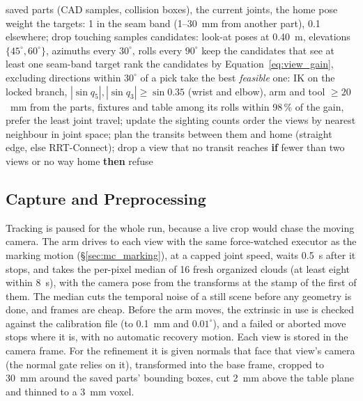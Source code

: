 \begin{algorithm}[htbp]
\caption{Planning the close-range views}
\label{alg:mv_views}
\begin{algorithmic}[1]
\REQUIRE saved parts (CAD samples, collision boxes), the current joints, the home pose
\STATE weight the targets: 1 in the seam band (1--30~mm from another part), 0.1 elsewhere; drop touching samples
 candidates: look-at poses at 0.40~m, elevations $\{45^\circ,60^\circ\}$, azimuths every $30^\circ$, rolls every $90^\circ$
\STATE keep the candidates that see at least one seam-band target
  \STATE rank the candidates by Equation~\ref{eq:view_gain}, excluding directions within $30^\circ$ of a pick
  \STATE take the best \emph{feasible} one: IK on the locked branch, $|\sin q_5|,|\sin q_3|\ge\sin0.35$ (wrist and elbow), arm and tool $\ge20$~mm from the parts, fixtures and table
  \STATE among its rolls within 98\,\% of the gain, prefer the least joint travel; update the sighting counts
\ENDFOR
\STATE order the views by nearest neighbour in joint space; plan the transits between them and home (straight edge, else RRT-Connect); drop a view that no transit reaches
\STATE \textbf{if} fewer than two views or no way home \textbf{then} refuse
\end{algorithmic}
\end{algorithm}

\subsection{Capture and Preprocessing}
\label{sec:mv_capture}
Tracking is paused for the whole run, because a live crop would chase the moving camera. The arm
drives to each view with the same force-watched executor as the marking motion
(\S\ref{sec:mc_marking}), at a capped joint speed, waits 0.5~s after it stops, and takes the
per-pixel median of 16 fresh organized clouds (at least eight within 8~s), with the camera pose from
the transforms at the stamp of the first of them. The median cuts the temporal noise of a still scene before any geometry is done,
and frames are cheap. Before the arm moves, the extrinsic in use is checked against the calibration
file (to 0.1~mm and $0.01^\circ$), and a failed or aborted move stops where it is, with no automatic recovery motion.
Each view is stored in the camera frame. For the refinement it is given normals that face that
view's camera (the normal gate relies on it), transformed into the base frame, cropped to 30~mm
around the saved parts' bounding boxes, cut 2~mm above the table plane and thinned to a 3~mm voxel.

